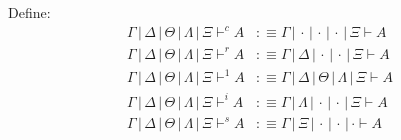 \documentclass[a4paper,12pt]{article}
\newcommand{\yields}{\vdash}
\newcommand{\cbar}{\, | \,}
\begin{document}
Define:
\begin{align*}
    \Gamma \cbar \Delta \cbar \Theta \cbar \Lambda \cbar \Xi \yields^c A &:\equiv \Gamma \cbar \cdot \cbar \cdot \cbar \cdot \cbar \Xi \yields A \\
    \Gamma \cbar \Delta \cbar \Theta \cbar \Lambda \cbar \Xi \yields^r A &:\equiv \Gamma \cbar \Delta \cbar \cdot \cbar \cdot \cbar \Xi \yields A \\
    \Gamma \cbar \Delta \cbar \Theta \cbar \Lambda \cbar \Xi \yields^1 A &:\equiv \Gamma \cbar \Delta \cbar \Theta \cbar \Lambda \cbar \Xi \yields A \\
    \Gamma \cbar \Delta \cbar \Theta \cbar \Lambda \cbar \Xi \yields^i A &:\equiv \Gamma \cbar \Lambda \cbar \cdot \cbar \cdot \cbar \Xi \yields A \\
    \Gamma \cbar \Delta \cbar \Theta \cbar \Lambda \cbar \Xi \yields^s A &:\equiv \Gamma \cbar \Xi \cbar \cdot \cbar \cdot \cbar \cdot \yields A 
\end{align*}
\end{document}
